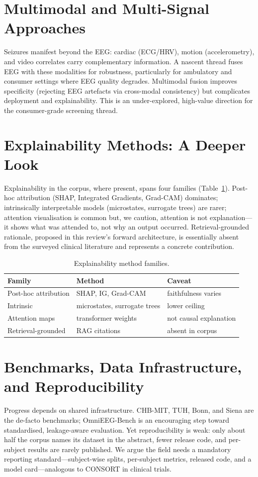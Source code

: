 \section{Multimodal and Multi-Signal Approaches}
Seizures manifest beyond the EEG: cardiac (ECG/HRV), motion (accelerometry), and video correlates carry complementary information. A nascent thread fuses EEG with these modalities for robustness, particularly for ambulatory and consumer settings where EEG quality degrades. Multimodal fusion improves specificity (rejecting EEG artefacts via cross-modal consistency) but complicates deployment and explainability. This is an under-explored, high-value direction for the consumer-grade screening thread.

\section{Explainability Methods: A Deeper Look}
Explainability in the corpus, where present, spans four families (Table~\ref{tab:xai}). Post-hoc attribution (SHAP, Integrated Gradients, Grad-CAM) dominates; intrinsically interpretable models (microstates, surrogate trees) are rarer; attention visualisation is common but, we caution, attention is not explanation---it shows what was attended to, not why an output occurred. Retrieval-grounded rationale, proposed in this review's forward architecture, is essentially absent from the surveyed clinical literature and represents a concrete contribution.
\begin{table}[h]\centering\caption{Explainability method families.}\label{tab:xai}
\footnotesize\begin{tabular}{lll}\toprule
Family & Method & Caveat\\\midrule
Post-hoc attribution & SHAP, IG, Grad-CAM & faithfulness varies\\
Intrinsic & microstates, surrogate trees & lower ceiling\\
Attention maps & transformer weights & not causal explanation\\
Retrieval-grounded & RAG citations & absent in corpus\\\bottomrule
\end{tabular}\end{table}

\section{Benchmarks, Data Infrastructure, and Reproducibility}
Progress depends on shared infrastructure. CHB-MIT, TUH, Bonn, and Siena are the de-facto benchmarks; OmniEEG-Bench \citep{ep260600815} is an encouraging step toward standardised, leakage-aware evaluation. Yet reproducibility is weak: only about half the corpus names its dataset in the abstract, fewer release code, and per-subject results are rarely published. We argue the field needs a mandatory reporting standard---subject-wise splits, per-subject metrics, released code, and a model card---analogous to CONSORT in clinical trials.

